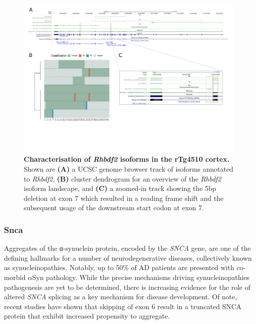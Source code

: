 \begin{landscape}
	\begin{figure}[htp]
		\centering
		\includegraphics[page=9,trim={0 5cm 0 0},scale = 0.85]{Figures/TargetGenes_Annotation_Landscape.pdf}
		\captionsetup{width=1.3\textwidth}
		\caption[Characterisation of the \textit{Rbhdf2} isoform landscape]%
		{\textbf{Characterisation of \textit{Rhbdf2} isoforms in the rTg4510 cortex.} Shown are \textbf{(A)} a UCSC genome browser track of isoforms annotated to \textit{Rhbdf2}, \textbf{(B)} cluster dendrogram for an overview of the \textit{Rhbdf2} isoform landscape, and \textbf{(C)} a zoomed-in track showing the 5bp deletion at exon 7 which resulted in a reading frame shift and the subsequent usage of the downstream start codon at exon 7.}   
		\label{fig:rhbdf2}
	\end{figure}
\end{landscape}
\restoregeometry

\newpage
\subsubsection{Snca}
Aggregates of the α-synuclein protein, encoded by the \textit{SNCA} gene, are one of the defining hallmarks for a number of neurodegenerative diseases, collectively known as synucleinopathies. Notably, up to 50\% of AD patients are presented with co-morbid $\alpha$Syn pathology. While the precise mechanisms driving synucleinopathies pathogenesis are yet to be determined, there is increasing evidence for the role of altered \textit{SNCA} splicing as a key mechanism for disease development\cite{Beyer2012, Beyer2006}. Of note, recent studies have shown that skipping of exon 6 result in a truncated SNCA protein that exhibit increased propensity to aggregate\cite{Beyer2012, Beyer2006}. 

